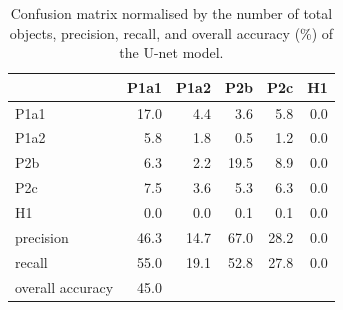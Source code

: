 \documentclass{isprs} %
\begin{document}
 \begin{table}
  \centering
\begin{tabular}{lrrrrr}
\toprule
{} &  P1a1 &  P1a2 &   P2b &   P2c &   H1 \\
\midrule
P1a1             &  17.0 &   4.4 &   3.6 &   5.8 &  0.0 \\
P1a2             &   5.8 &   1.8 &   0.5 &   1.2 &  0.0 \\
P2b              &   6.3 &   2.2 &  19.5 &   8.9 &  0.0 \\
P2c              &   7.5 &   3.6 &   5.3 &   6.3 &  0.0 \\
H1               &   0.0 &   0.0 &   0.1 &   0.1 
&  0.0 \\
\midrule
precision       &  46.3 &  14.7 &  67.0 &  28.2 &  0.0    \\
recall           &  55.0 &  19.1 &  52.8 &  27.8 &  0.0 \\
overall accuracy &  45.0 &       &       &       &      \\
\bottomrule
\end{tabular}
\caption{
Confusion matrix normalised by the number of total objects, precision, recall, and overall accuracy (\%) of the U-net model.}
\label{deepconf}
\end{table}
\end{document}
